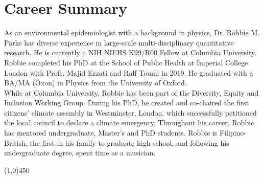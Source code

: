 \section*{Career Summary}

As an environmental epidemiologist with a background in physics, Dr. Robbie M. Parks has diverse experience in large-scale multi-disciplinary quantitative research. He is currently a NIH NIEHS K99/R00 Fellow at Columbia University. Robbie completed his PhD at the School of Public Health at Imperial College London with Profs. Majid Ezzati and Ralf Toumi in 2019. He graduated with a BA/MA (Oxon) in Physics from the University of Oxford.\\ 

\noindent While at Columbia University, Robbie has been part of the Diversity, Equity and Inclusion Working Group. During his PhD, he created and co-chaired the first citizens’ climate assembly in Westminster, London, which successfully petitioned the local council to declare a climate emergency. Throughout his career, Robbie has mentored undergraduate, Master’s and PhD students. Robbie is Filipino-British, the first in his family to graduate high school, and following his undergraduate degree, spent time as a musician.



\begin{center} \line(1,0){450} \end{center}